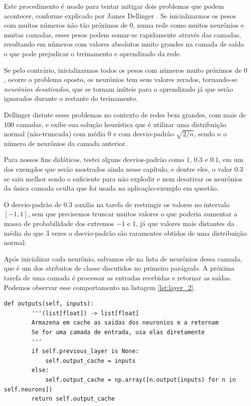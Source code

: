 Este procedimento é usado para tentar mitigar dois problemas que podem acontecer, conforme explicado por James Dellinger \citep{layers_1}. Se inicializarmos os pesos com muitos números não tão próximos de $0$, numa rede como muitos neurônios e muitas camadas, esses pesos podem somar-se rapidamente através das camadas, resultando em números com valores absolutos muito grandes na camada de saída o que pode prejudicar o treinamento e aprendizado da rede.

Se pelo contrário, inicializarmos todos os pesos com números muito próximos de $0$, ocorre o problema oposto, os neurônios tem seus valores zerados, tornando-se \emph{neurônios desativados}, que se tornam inúteis para o aprendizado já que serão ignorados durante o restante do treinamento. 

Dellinger \citep{layers_1} distute esses problemas no contexto de redes bem grandes, com mais de $100$ camadas, e exibe sua solução heurística que é utilizar uma distribuição normal (não-truncada) com média $0$ e com desvio-padrão $\sqrt{2/n}$, sendo $n$ o número de neurônios da camada anterior.

Para nossos fins didáticos, testei alguns desvios-padrão como $1$, $0.3$ e $0.1$, em um dos exemplos que serão mostrados ainda nesse capítulo, e dentre eles, o valor $0.3$ se saiu melhor sendo o suficiente para não explodir e nem desativar os neurônios da única camada oculta que foi usada na aplicação-exemplo em questão.

O desvio-padrão de $0.3$ auxilia na tarefa de restringir os valores no intervalo $[-1, 1]$, sem que precisemos truncar muitos valores o que poderia aumentar a massa de probabilidade dos extremos $-1$ e $1$, já que valores mais distantes da média do que $3$ vezes o desvio-padrão são raramentes obtidos de uma distribuição normal. 

Após inicializar cada neurônio, salvamos ele na lista de neurônios dessa camada, que é um dos atributos de classe discutidos no primeiro parágrafo. A próxima tarefa de uma camada é processar as entradas recebidas e retornar as saídas. Podemos observar esse comportamento na listagem \ref{lst:layer_2}.

\newpage

\begin{scriptsize}
\estiloR
\begin{lstlisting}[caption={Trecho da classe \eng{Layer}}, label={lst:layer_2}, escapeinside={\%}]
def outputs(self, inputs):
        '''(list[float]) -> list[float]
        Armazena em cache as saidas dos neuronios e a retornam
        Se for uma camada de entrada, usa elas diretamente
        '''
        if self.previous_layer is None:
            self.output_cache = inputs
        else:
            self.output_cache = np.array([n.output(inputs) for n in self.neurons])
        return self.output_cache
\end{lstlisting}
\end{scriptsize}


